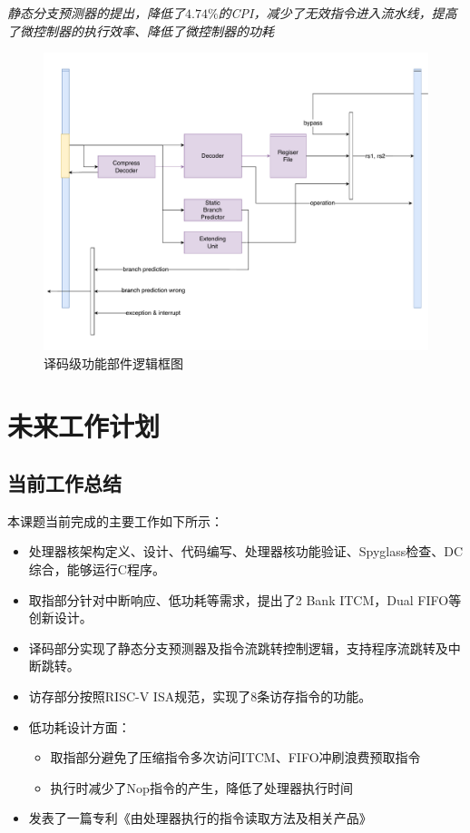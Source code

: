\documentclass[a4paper, 12pt]{article}
\begin{document}
  \textit{静态分支预测器的提出，降低了$4.74\%$的CPI，减少了无效指令进入流水线，提高了微控制器的执行效率、降低了微控制器的功耗}
  \begin{figure}[htbp]
    \centering
    \includegraphics[width=0.8\linewidth]{./images/id_top.pdf}
    \caption{译码级功能部件逻辑框图}
    \label{fig:id_top}
  \end{figure}

\clearpage
\section{未来工作计划}%
\subsection{当前工作总结}

本课题当前完成的主要工作如下所示：
\begin{itemize}
  \item 处理器核架构定义、设计、代码编写、处理器核功能验证、Spyglass检查、DC综合，能够运行C程序。
  \item 取指部分针对中断响应、低功耗等需求，提出了2 Bank ITCM，Dual FIFO等创新设计\cite{10163410}。
  \item 译码部分实现了静态分支预测器及指令流跳转控制逻辑，支持程序流跳转及中断跳转。
  \item 访存部分按照RISC-V ISA规范，实现了8条访存指令的功能。
  \item 低功耗设计方面：
  \begin{itemize}
    \item 取指部分避免了压缩指令多次访问ITCM、FIFO冲刷浪费预取指令
    \item 执行时减少了Nop指令的产生，降低了处理器执行时间
  \end{itemize}
  \item 发表了一篇专利《由处理器执行的指令读取方法及相关产品》
\end{itemize}
\end{document}
